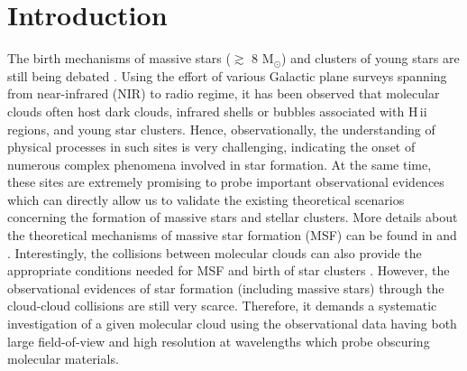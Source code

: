 \documentclass[iop]{emulateapj}
\begin{document}
\section{Introduction}
\label{sec:intro}
%
The birth mechanisms of massive stars ($\gtrsim$ 8 M$_{\odot}$) and clusters of young stars are still being 
debated \citep{zin07,tan14}. 
Using the effort of various Galactic plane surveys spanning from near-infrared (NIR) to radio regime, it has been observed that 
molecular clouds often host dark clouds, infrared shells or bubbles associated with H\,{\sc ii} regions, and 
young star clusters. 
Hence, observationally, the understanding of physical processes in such sites is very challenging, indicating 
the onset of numerous complex phenomena involved in star formation.
At the same time, these sites are extremely promising to probe important observational evidences which can directly allow us to validate the 
existing theoretical scenarios concerning the formation of massive stars and stellar clusters. 
More details about the theoretical mechanisms of massive star formation (MSF) can be found in \citet{zin07} and \citet{tan14}. 
Interestingly, the collisions between molecular clouds can also provide the appropriate conditions needed for MSF and birth of star clusters \citep[e.g.,][]{habe92,furukawa09,ohama10,inoue13,fukui14,fukui16,torii15,torii16,haworth15a,haworth15b}. 
However, the observational evidences of star formation (including massive stars) through the cloud-cloud collisions are still very scarce. 
Therefore, it demands a systematic investigation of a given molecular cloud using the observational data having both large field-of-view and 
high resolution at wavelengths which probe obscuring molecular materials.
 
\end{document}
